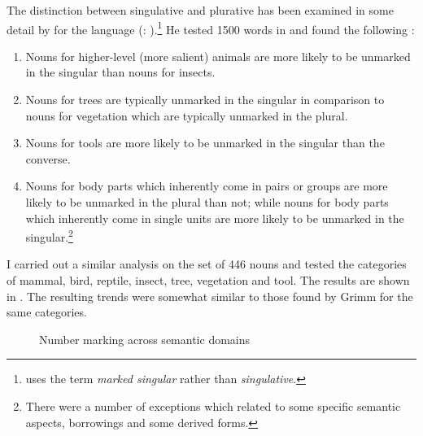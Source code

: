 \documentclass[output=paper]{langsci/langscibook}
\begin{document}
The distinction between singulative and plurative has been examined in some detail by \citet{Grimm2012} for the  language (: ).\footnote{\citet{Grimm2012} uses the term \textit{marked singular} rather than \textit{singulative}.} He tested 1500 words in  and found the following \citep[50]{Grimm2012}:

\begin{enumerate}[label=\roman*.]
\item Nouns for higher-level (more salient) animals are more likely to be unmarked in the singular than nouns for insects. 
\item Nouns for trees are typically unmarked in the singular in comparison to nouns for vegetation which are typically unmarked in the plural. 
\item Nouns for tools are more likely to be unmarked in the singular than the converse. 
\item Nouns for body parts which inherently come in pairs or groups are more likely to be unmarked in the plural than not; while nouns for body parts which inherently come in single units are more likely to be unmarked in the singular.\footnote{There were a number of exceptions which related to some specific semantic aspects, borrowings and some derived forms.}
\end{enumerate}

I carried out a similar analysis on the set of 446  nouns and tested the categories of mammal, bird, reptile, insect, tree, vegetation and tool. The results are shown in . The resulting trends were somewhat similar to those found by Grimm for the same categories. 

\begin{figure}
\caption{Number marking across semantic domains}
\label{fig:moodie:1}
\end{figure}
\end{document}
